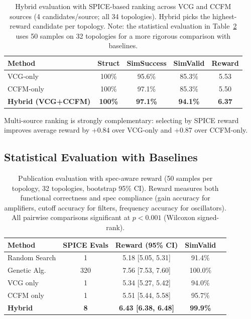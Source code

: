 \documentclass[conference]{IEEEtran}
\begin{document}
\begin{table}[t]
\centering
\caption{Hybrid evaluation with SPICE-based ranking across VCG and CCFM
sources (4 candidates/source; all 34 topologies).
Hybrid picks the highest-reward candidate per topology. Note: the
statistical evaluation in Table~\ref{tab:pub_eval} uses 50 samples on
32 topologies for a more rigorous comparison with baselines.}
\label{tab:hybrid}
\begin{tabular}{@{}lcccc@{}}
\toprule
Method & Struct & SimSuccess & SimValid & Reward \\
\midrule
VCG-only    & 100\% & 95.6\% & 85.3\% & 5.53 \\
CCFM-only   & 100\% & 97.1\% & 85.3\% & 5.50 \\
\textbf{Hybrid (VCG+CCFM)} & \textbf{100\%} & \textbf{97.1\%} & \textbf{94.1\%} & \textbf{6.37} \\
\bottomrule
\end{tabular}
\end{table}

Multi-source ranking is strongly complementary: selecting by SPICE
reward improves average reward by +0.84 over VCG-only and +0.87 over
CCFM-only.

\subsection{Statistical Evaluation with Baselines}

\begin{table}[t]
\centering
\caption{Publication evaluation with spec-aware reward (50 samples per
topology, 32 topologies, bootstrap 95\% CI). Reward measures both
functional correctness and spec compliance (gain accuracy for amplifiers,
cutoff accuracy for filters, frequency accuracy for oscillators).
All pairwise comparisons significant at $p < 0.001$ (Wilcoxon signed-rank).}
\label{tab:pub_eval}
\begin{tabular}{@{}lcccc@{}}
\toprule
Method & SPICE Evals & Reward (95\% CI) & SimValid \\
\midrule
Random Search   & 1   & 5.18 [5.05, 5.31] & 91.4\% \\
Genetic Alg.    & 320 & 7.56 [7.53, 7.60] & 100.0\% \\
\midrule
VCG only        & 1   & 5.34 [5.27, 5.42] & 94.0\% \\
CCFM only       & 1   & 5.51 [5.44, 5.58] & 95.7\% \\
\textbf{Hybrid} & \textbf{8} & \textbf{6.43 [6.38, 6.48]} & \textbf{99.9\%} \\
\bottomrule
\end{tabular}
\end{table}
\end{document}
